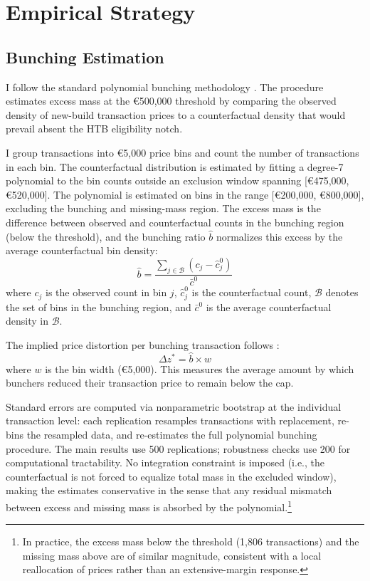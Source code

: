\documentclass[12pt]{article}
\newcommand{\eur}[1]{\euro{}#1}
\begin{document}



\section{Empirical Strategy}

\subsection{Bunching Estimation}

I follow the standard polynomial bunching methodology \citep{kleven2016bunching,chetty2011adjustment}. The procedure estimates excess mass at the \eur{500,000} threshold by comparing the observed density of new-build transaction prices to a counterfactual density that would prevail absent the HTB eligibility notch.

I group transactions into \eur{5,000} price bins and count the number of transactions in each bin. The counterfactual distribution is estimated by fitting a degree-7 polynomial to the bin counts outside an exclusion window spanning [\eur{475,000}, \eur{520,000}]. The polynomial is estimated on bins in the range [\eur{200,000}, \eur{800,000}], excluding the bunching and missing-mass region. The excess mass is the difference between observed and counterfactual counts in the bunching region (below the threshold), and the bunching ratio $\hat{b}$ normalizes this excess by the average counterfactual bin density:
\begin{equation}
\hat{b} = \frac{\sum_{j \in \mathcal{B}} (c_j - \hat{c}_j^0)}{\bar{c}^0}
\end{equation}
where $c_j$ is the observed count in bin $j$, $\hat{c}_j^0$ is the counterfactual count, $\mathcal{B}$ denotes the set of bins in the bunching region, and $\bar{c}^0$ is the average counterfactual density in $\mathcal{B}$.

The implied price distortion per bunching transaction follows \citet{kleven2016bunching}:
\begin{equation}
\Delta z^* = \hat{b} \times w
\end{equation}
where $w$ is the bin width (\eur{5,000}). This measures the average amount by which bunchers reduced their transaction price to remain below the cap.

Standard errors are computed via nonparametric bootstrap at the individual transaction level: each replication resamples transactions with replacement, re-bins the resampled data, and re-estimates the full polynomial bunching procedure. The main results use 500 replications; robustness checks use 200 for computational tractability. No integration constraint is imposed (i.e., the counterfactual is not forced to equalize total mass in the excluded window), making the estimates conservative in the sense that any residual mismatch between excess and missing mass is absorbed by the polynomial.\footnote{In practice, the excess mass below the threshold (1,806 transactions) and the missing mass above are of similar magnitude, consistent with a local reallocation of prices rather than an extensive-margin response.}
\end{document}
